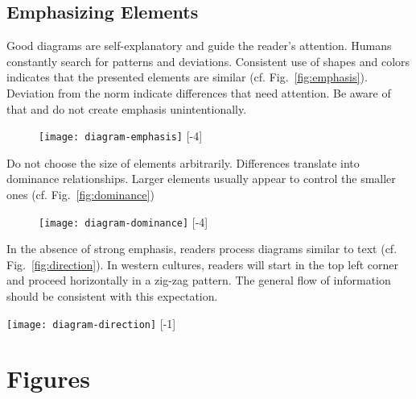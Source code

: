 \subsection{Emphasizing Elements}

Good diagrams are self-explanatory and guide the reader's attention. Humans constantly search for patterns and deviations. Consistent use of shapes and colors indicates that the presented elements are similar (cf. Fig.~\ref{fig:emphasis}). Deviation from the norm indicate differences that need attention. Be aware of that and do not create emphasis unintentionally.

\begin{figure}[t]
\centering
\texttt{[image: diagram-emphasis]}
[-4\baselineskip]
\end{figure}

Do not choose the size of elements arbitrarily. Differences translate into dominance relationships. Larger elements usually appear to control the smaller ones (cf. Fig.~\ref{fig:dominance})

\begin{figure}[t]
\centering
\texttt{[image: diagram-dominance]}
[-4\baselineskip]
\end{figure}

In the absence of strong emphasis, readers process diagrams similar to text (cf. Fig.~\ref{fig:direction}). In western cultures, readers will start in the top left corner and proceed horizontally in a zig-zag pattern. The general flow of information should be consistent with this expectation.

\begin{marginfigure}
\centering
\texttt{[image: diagram-direction]}
[-1\baselineskip]
\end{marginfigure}

\section{Figures}

















